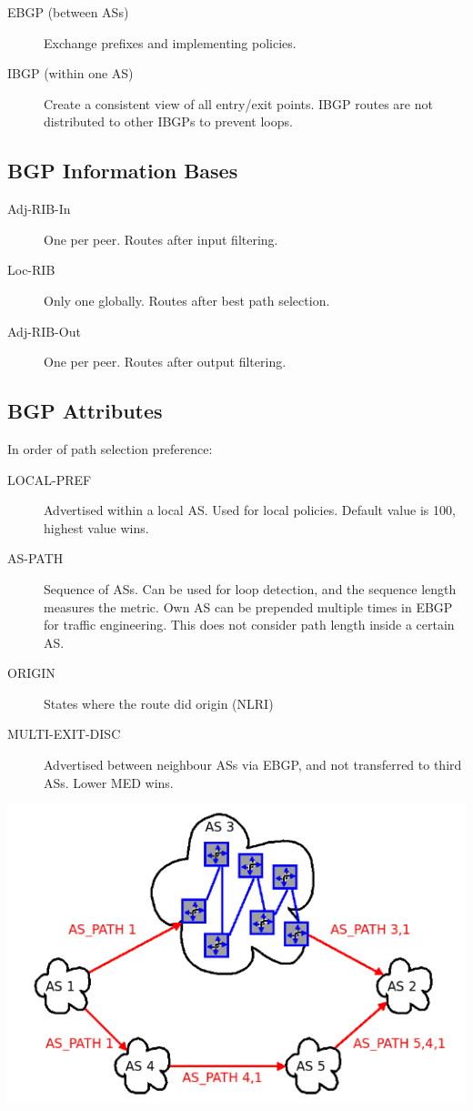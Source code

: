 \documentclass{article}
\begin{document}
\begin{description}
	\item[EBGP (between ASs)] Exchange prefixes and implementing policies.
	\item[IBGP (within one AS)] Create a consistent view of all entry/exit points. IBGP routes are not distributed to other IBGPs to prevent loops. 
\end{description}


\subsection{BGP Information Bases}


\begin{description}
	\item[Adj-RIB-In] One per peer. Routes after input filtering.
	\item[Loc-RIB] Only one globally. Routes after best path selection.
	\item[Adj-RIB-Out] One per peer. Routes after output filtering.
\end{description}


\subsection{BGP Attributes}

In order of path selection preference:

\begin{description}
	\item[LOCAL-PREF] Advertised within a local AS. Used for local policies. Default value is 100, highest value wins.
	\item[AS-PATH] Sequence of ASs. Can be used for loop detection, and the sequence length measures the metric. Own AS can be prepended multiple times in EBGP for traffic engineering. This does not consider path length inside a certain AS.
	\item[ORIGIN] States where the route did origin (NLRI)
	\item[MULTI-EXIT-DISC] Advertised between neighbour ASs via EBGP, and not transferred to third ASs. Lower MED wins.
\end{description}

\centerline{\includegraphics[scale=0.5]{images/AS_PATH.png}\\[1cm]}
\end{document}
